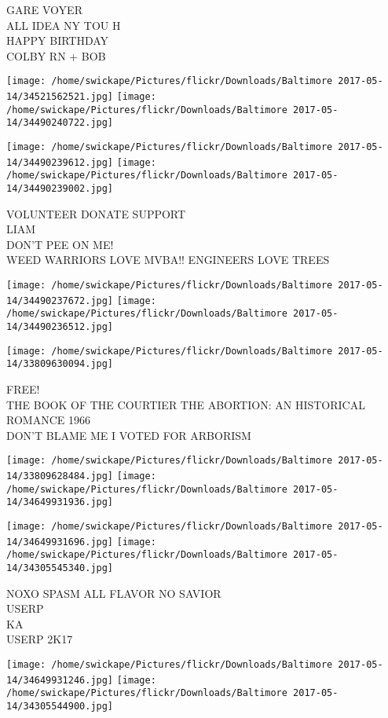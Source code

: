 \documentclass[10pt,letterpaper]{article}
\begin{document}
GARE VOYER\\
ALL IDEA NY TOU H\\
HAPPY BIRTHDAY\\
COLBY RN + BOB
\pagebreak

\texttt{[image: /home/swickape/Pictures/flickr/Downloads/Baltimore 2017-05-14/34521562521.jpg]}
\texttt{[image: /home/swickape/Pictures/flickr/Downloads/Baltimore 2017-05-14/34490240722.jpg]}

\texttt{[image: /home/swickape/Pictures/flickr/Downloads/Baltimore 2017-05-14/34490239612.jpg]}
\texttt{[image: /home/swickape/Pictures/flickr/Downloads/Baltimore 2017-05-14/34490239002.jpg]}

VOLUNTEER DONATE SUPPORT\\
LIAM\\
DON'T PEE ON ME!\\
WEED WARRIORS LOVE MVBA!!  ENGINEERS LOVE TREES
\pagebreak

\texttt{[image: /home/swickape/Pictures/flickr/Downloads/Baltimore 2017-05-14/34490237672.jpg]}
\texttt{[image: /home/swickape/Pictures/flickr/Downloads/Baltimore 2017-05-14/34490236512.jpg]}

\vspace{0.25in}
\texttt{[image: /home/swickape/Pictures/flickr/Downloads/Baltimore 2017-05-14/33809630094.jpg]}

FREE!\\
THE BOOK OF THE COURTIER THE ABORTION: AN HISTORICAL ROMANCE 1966\\
DON'T BLAME ME I VOTED FOR ARBORISM
\pagebreak

\texttt{[image: /home/swickape/Pictures/flickr/Downloads/Baltimore 2017-05-14/33809628484.jpg]}
\texttt{[image: /home/swickape/Pictures/flickr/Downloads/Baltimore 2017-05-14/34649931936.jpg]}

\texttt{[image: /home/swickape/Pictures/flickr/Downloads/Baltimore 2017-05-14/34649931696.jpg]}
\texttt{[image: /home/swickape/Pictures/flickr/Downloads/Baltimore 2017-05-14/34305545340.jpg]}

NOXO SPASM ALL FLAVOR NO SAVIOR\\
USERP\\
KA\\
USERP 2K17
\pagebreak

\texttt{[image: /home/swickape/Pictures/flickr/Downloads/Baltimore 2017-05-14/34649931246.jpg]}
\texttt{[image: /home/swickape/Pictures/flickr/Downloads/Baltimore 2017-05-14/34305544900.jpg]}
\end{document}
